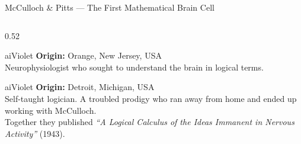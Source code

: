 \begin{frame}[shrink=5]{McCulloch \& Pitts --- The First Mathematical Brain Cell}

  \begin{columns}[T]
    \begin{column}{0.52\textwidth}
      \begin{personbox}{aiViolet}
        \textbf{Origin:} Orange, New Jersey, USA\\[3pt]
        Neurophysiologist who sought to understand the brain
        in logical terms.
      \end{personbox}

      \vspace{0.3em}

      \begin{personbox}{aiViolet}
        \textbf{Origin:} Detroit, Michigan, USA\\[3pt]
        Self-taught logician. A troubled prodigy who ran away from
        home and ended up working with McCulloch.\\[3pt]
        Together they published \emph{``A Logical Calculus of the Ideas
        Immanent in Nervous Activity''} (1943).
      \end{personbox}
    \end{column}


\end{columns}
\end{frame}
